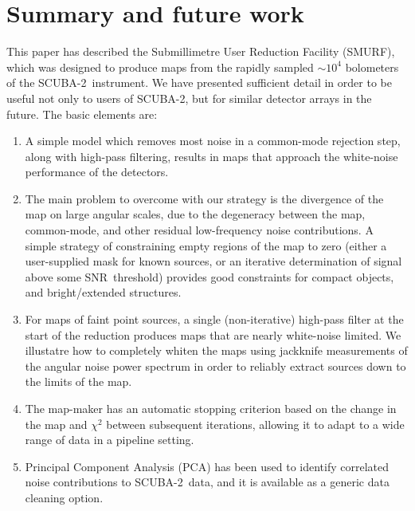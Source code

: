 \documentclass[useAMS,usenatbib,nofootinbib]{mn2e}
\newcommand{\snr}{SNR}
\newcommand{\scuba}{SCUBA-2}
\begin{document}
\section{Summary and future work}
\label{sec:summary}

This paper has described the Submillimetre User Reduction Facility
(SMURF), which was designed to produce maps from the rapidly sampled
$\sim10^4$ bolometers of the \scuba\ instrument. We have presented
sufficient detail in order to be useful not only to users of \scuba,
but for similar detector arrays in the future. The basic elements are:

\begin{enumerate}

\item A simple model which removes most noise in a common-mode
rejection step, along with high-pass filtering, results in maps that
approach the white-noise performance of the detectors.

\item The main problem to overcome with our strategy is the divergence
of the map on large angular scales, due to the degeneracy between the
map, common-mode, and other residual low-frequency noise
contributions. A simple strategy of constraining empty regions of the
map to zero (either a user-supplied mask for known sources, or an
iterative determination of signal above some \snr\ threshold) provides
good constraints for compact objects, and bright/extended structures.

\item For maps of faint point sources, a single (non-iterative)
high-pass filter at the start of the reduction produces maps that are
nearly white-noise limited. We illustatre how to completely whiten the
maps using jackknife measurements of the angular noise power spectrum
in order to reliably extract sources down to the limits of the map.

\item The map-maker has an automatic stopping criterion based on the
change in the map and $\chi^2$ between subsequent iterations, allowing
it to adapt to a wide range of data in a pipeline setting.

\item Principal Component Analysis (PCA) has been used to identify
correlated noise contributions to \scuba\ data, and it is available as
a generic data cleaning option.


\end{enumerate}
\end{document}
